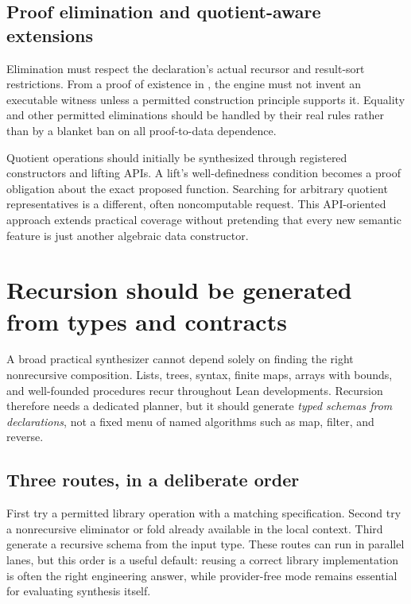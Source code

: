 \subsection{Proof elimination and quotient-aware extensions}

Elimination must respect the declaration's actual recursor and result-sort
restrictions. From a proof of existence in , the engine must not
invent an executable witness unless a permitted construction principle
supports it. Equality and other permitted eliminations should be handled by
their real rules rather than by a blanket ban on all proof-to-data dependence.

Quotient operations should initially be synthesized through registered
constructors and lifting APIs. A lift's well-definedness condition becomes a
proof obligation about the exact proposed function. Searching for arbitrary
quotient representatives is a different, often noncomputable request. This
API-oriented approach extends practical coverage without pretending that every
new semantic feature is just another algebraic data constructor.

\section{Recursion should be generated from types and contracts}\label{sec:recursion}

A broad practical synthesizer cannot depend solely on finding the right
nonrecursive composition. Lists, trees, syntax, finite maps, arrays with bounds,
and well-founded procedures recur throughout Lean developments. Recursion
therefore needs a dedicated planner, but it should generate \emph{typed
schemas from declarations}, not a fixed menu of named algorithms such as map,
filter, and reverse.

\subsection{Three routes, in a deliberate order}

First try a permitted library operation with a matching specification. Second
try a nonrecursive eliminator or fold already available in the local context.
Third generate a recursive schema from the input type. These routes can run in
parallel lanes, but this order is a useful default: reusing a correct library
implementation is often the right engineering answer, while provider-free mode
remains essential for evaluating synthesis itself.

